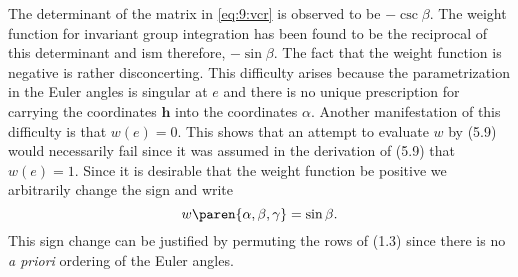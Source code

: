 The determinant of the matrix in \eqref{eq:9:vcr} is observed to be $-\csc \beta$.
The weight function for invariant group integration has been found to be the reciprocal of this determinant and ism therefore, $-\sin \beta$. The fact that the weight function is negative is rather disconcerting. This difficulty arises because the parametrization in the Euler angles is singular at $e$ and there is no unique prescription for carrying the coordinates $\mathbf{h}$ into the coordinates $\alpha$. Another manifestation of this difficulty is that $w(e) = 0$.	This shows that an attempt to evaluate $w$ by (5.9) would necessarily fail since it was assumed in the derivation of (5.9) that $w(e) = 1$. Since it is desirable that the weight function be positive we arbitrarily change the sign and write
\begin{equation}
  w \paren{ \alpha, \beta, \gamma } = \sin \beta .
\end{equation}
This sign change can be justified by permuting the rows of (1.3) since there is no \emph{a priori} ordering of the Euler angles.

\endinput